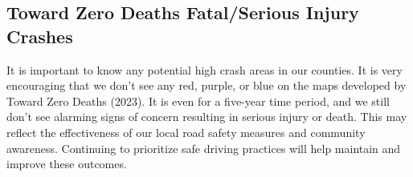 \documentclass[
  a4paper,
  landscape]{scrreprt}
\begin{document}
\subsection{Toward Zero Deaths Fatal/Serious Injury
Crashes}\label{toward-zero-deaths-fatalserious-injury-crashes}

It is important to know any potential high crash areas in our counties.
It is very encouraging that we don't see any red, purple, or blue on the
maps developed by Toward Zero Deaths (2023). It is even for a five-year
time period, and we still don't see alarming signs of concern resulting
in serious injury or death. This may reflect the effectiveness of our
local road safety measures and community awareness. Continuing to
prioritize safe driving practices will help maintain and improve these
outcomes.

\begin{figure}[H]


\end{figure}
\end{document}
